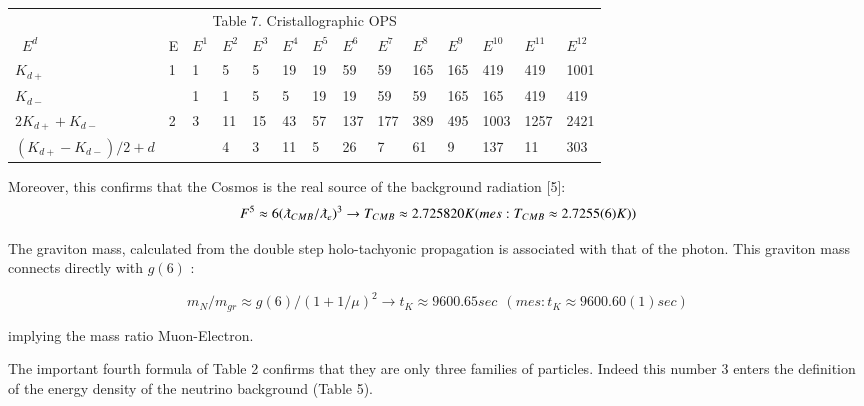 \documentclass[a4paper,9pt]{article}
\begin{document}
\begin{table*}
  \hskip 1.0cm\begin{tabular}{llllllllllllll}
    \toprule
    \multicolumn{14}{c}{Table 7. Cristallographic OPS}                  \\
    \cmidrule(r){1-14}
    \ $E^d$ & E & $E^1$  & $E^2$ & $E^3$ & $E^4$ & $E^5$ & $E^6$ & $E^7$ & $E^8$ & $E^9$ & $E^{10}$ & $E^{11}$ & $E^{12}$ \\
    \midrule
    $K_{d+}$  & 1 & 1 & 5 & 5 & 19 & 19 & 59 & 59 & 165 & 165 & 419 & 419 & 1001 \\
    
     $K_{d-}$  &  & 1 & 1 & 5 & 5 & 19 & 19 & 59 & 59 & 165 & 165& 419 & 419 \\
     
     $2K_{d+} + K_{d-}$  & 2 & 3 & 11 & 15 & 43 & 57 & 137 & 177 & 389 & 495 & 1003 & 1257& 2421 \\
     
      $(K_{d+} - K_{d-})/2 + d$  &  &  & 4 & 3 & 11 & 5 & 26 & 7 & 61 & 9 & 137 & 11& 303 \\

    \bottomrule
  \end{tabular}
  \label{tab:table}
\end{table*}


Moreover, this confirms that the Cosmos is the real source of the background radiation [5]:
\begin{equation}
F^5  \approx 6(\lambdabar_{CMB}/\lambdabar_{e})^3 \rightarrow  T_{CMB}  \approx  2.725820 K  (mes : T_{CMB}  \approx  2.7255(6) K)) 
\end{equation}


The graviton mass, calculated from the double step holo-tachyonic propagation is associated with that of the photon. This graviton mass connects directly with $g(6)$ :

\begin{equation}
m_N/m_{gr} \approx g(6)/(1+1/\mu)^2 \rightarrow    t_K  \approx  9600.65 sec ~~(mes : t_K \approx 9600.60(1) sec)    
\end{equation}

implying the mass ratio Muon-Electron. 

The important fourth formula of Table 2 confirms that they are only three families of particles. Indeed this number 3 enters the definition of the energy density of the neutrino background (Table 5). 

\end{document}
